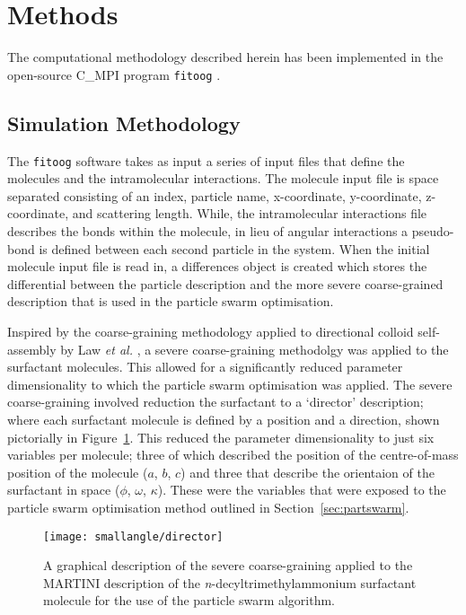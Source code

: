 \section{Methods}

The computational methodology described herein has been implemented in the open-source C\_MPI program \texttt{fitoog} \cite{mccluskey_arm61/fitoog_2019}.

\subsection{Simulation Methodology}

The \texttt{fitoog} software takes as input a series of input files that define the molecules and the intramolecular interactions.
The molecule input file is space separated consisting of an index, particle name, x-coordinate, y-coordinate, z-coordinate, and scattering length.
While, the intramolecular interactions file describes the bonds within the molecule, in lieu of angular interactions a pseudo-bond is defined between each second particle in the system.
When the initial molecule input file is read in, a differences object is created which stores the differential between the particle description and the more severe coarse-grained description that is used in the particle swarm optimisation.

Inspired by the coarse-graining methodology applied to directional colloid self-assembly by Law \emph{et al.} \cite{law_coarse-grained_2016}, a severe coarse-graining methodolgy was applied to the surfactant molecules.
This allowed for a significantly reduced parameter dimensionality to which the particle swarm optimisation was applied.
The severe coarse-graining involved reduction the surfactant to a `director' description; where each surfactant molecule is defined by a position and a direction, shown pictorially in Figure~\ref{fig:director}.
This reduced the parameter dimensionality to just six variables per molecule; three of which described the position of the centre-of-mass position of the molecule ($a$, $b$, $c$) and three that describe the orientaion of the surfactant in space ($\phi$, $\omega$, $\kappa$).
These were the variables that were exposed to the particle swarm optimisation method outlined in Section~\ref{sec:partswarm}.
%
\begin{figure}
    \centering
    \texttt{[image: smallangle/director]}
    \caption{A graphical description of the severe coarse-graining applied to the MARTINI description of the \emph{n}-decyltrimethylammonium surfactant molecule for the use of the particle swarm algorithm.}
    \label{fig:director}
\end{figure}
%

